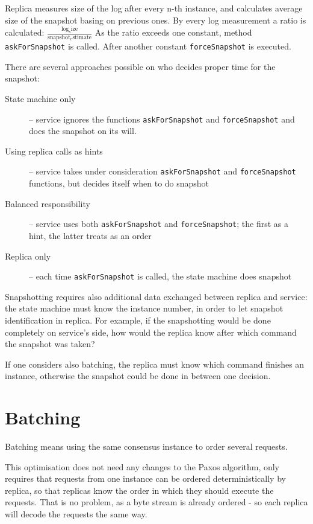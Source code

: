 Replica measures size of the log after every n-th instance, and calculates average size of the snapshot basing on previous ones. By every log measurement a ratio is calculated: $\frac{ \mathrm{log_size} }{ \mathrm{snapshot_estimate} }$ As the ratio exceeds one constant, method \texttt{askForSnapshot} is called. After another constant \texttt{forceSnapshot} is executed.

There are several approaches possible on who decides proper time for the snapshot:
\begin{description} 
 \item[State machine only] -- service ignores the functions \texttt{askForSnapshot} and \texttt{forceSnapshot} and does the snapshot on its will.
 \item[Using replica calls as hints] -- service takes under consideration \texttt{askForSnapshot} and \texttt{fo\-rceSnapshot} functions, but decides itself when to do snapshot
 \item[Balanced responsibility] -- service uses both \texttt{askForSnapshot} and \texttt{forceSnapshot}; the first as a hint, the latter treats as an order
 \item[Replica only] -- each time \texttt{askForSnapshot} is called, the state machine does snapshot
\end{description}

Snapshotting requires also additional data exchanged between replica and service: the state machine must know the instance number, in order to let snapshot identification in replica. For example, if the snapshotting would be done completely on service's side, how would the replica know after which command the snapshot was taken?

If one considers also batching, the replica must know which command finishes an instance, otherwise the snapshot could be done in between one decision.

\section{Batching}
\label{sec:batching}
Batching means using the same consensus instance to order several requests.

This optimisation does not need any changes to the Paxos algorithm, only requires that requests from one instance can be ordered deterministically by replica, so that replicas know the order in which they should execute the requests. That is no problem, as a byte stream is already ordered - so each replica will decode the requests the same way.

